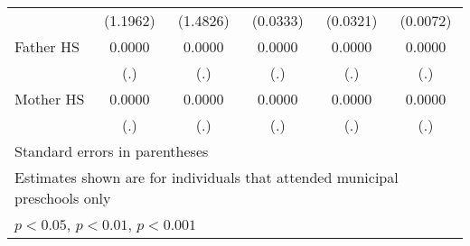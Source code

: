 \begin{table}[htbp]
\begin{tabular}{l*{5}{c}}
            &    (1.1962)         &    (1.4826)         &    (0.0333)         &    (0.0321)         &    (0.0072)         \\
\addlinespace
Father HS   &      0.0000         &      0.0000         &      0.0000         &      0.0000         &      0.0000         \\
            &         (.)         &         (.)         &         (.)         &         (.)         &         (.)         \\
\addlinespace
Mother HS   &      0.0000         &      0.0000         &      0.0000         &      0.0000         &      0.0000         \\
            &         (.)         &         (.)         &         (.)         &         (.)         &         (.)         \\
\bottomrule
\multicolumn{6}{l}{\footnotesize Standard errors in parentheses}\\
\multicolumn{6}{l}{\footnotesize Estimates shown are for individuals that attended municipal preschools only}\\
\multicolumn{6}{l}{\footnotesize \sym{*} \(p<0.05\), \sym{**} \(p<0.01\), \sym{***} \(p<0.001\)}\\
\end{tabular}
\end{table}
